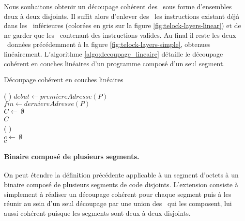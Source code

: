 Nous souhaitons obtenir un découpage cohérent des \layers\ sous forme d'ensembles deux à deux disjoints.
Il suffit alors d'enlever des \layers\ les instructions existant déjà dans les \layers\ inférieures (colorées en gris sur la figure \ref{fig:telock-layers-linear}) et de ne garder que les \layers\ contenant des instructions valides.
Au final il reste les deux \layers\ données précédemment à la figure \ref{fig:telock-layers-simple}, obtenues linéairement.
L'algorithme \ref{algo:decoupage_lineaire} détaille le découpage cohérent en couches linéaires d'un programme composé d'un seul segment.

\begin{algorithm}[h]
\caption{Découpage cohérent en couches linéaires}
\SetAlgoLined
{}
\Fn(
){}{
$debut \leftarrow premiereAdresse(P)$    \\
$fin \leftarrow derniereAdresse(P)$    \\
$C \leftarrow\ \emptyset$\\
\Return $C$
}
~\\
\Fn(
){}{
  \\
  $c \leftarrow\ \emptyset$\\
  \Return $c$
}
\label{algo:decoupage_lineaire}
\end{algorithm}

\paragraph{Binaire composé de plusieurs segments.}
On peut étendre la définition précédente applicable à un segment d'octets à un binaire composé de plusieurs segments de code disjoints.
L'extension consiste à simplement à réaliser un découpage cohérent pour chaque segment puis à les réunir au sein d'un seul découpage par une union des \layers\ qui les composent, lui aussi cohérent puisque les segments sont deux à deux disjoints.

